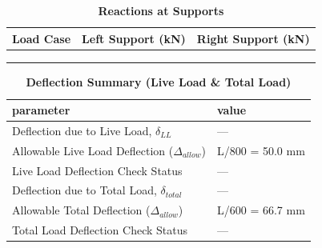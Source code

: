 \documentclass[12pt,a4paper]{report}
\numberwithin{table}{chapter}
\numberwithin{figure}{chapter}
\begin{document}
\vspace{1em}
\begin{longtable}{|>{\centering\arraybackslash}p{5.2cm}|>{\centering\arraybackslash}p{5.2cm}|>{\centering\arraybackslash}p{5.2cm}|}
\caption{\textbf{Reactions at Supports}}
\hline
\textbf{Load Case} & \textbf{Left Support (kN)} & \textbf{Right Support (kN)} \\[6pt]
\hline
 &  &  \\[6pt]
\hline
 &  &  \\[6pt]
\hline
 &  &  \\[6pt]
\hline
\end{longtable}

\vspace{1em}
\begin{longtable}{|L{7cm}|p{8.5cm}|}
\caption{\textbf{Deflection Summary (Live Load \& Total Load)}}
\hline
\textbf{parameter} & \textbf{value} \\
\hline
\textnormal{Deflection due to Live Load, $\delta_{LL}$} & --- \\[6pt]
\hline
\textnormal{Allowable Live Load Deflection ($\Delta_{allow}$)} & L/800 = 50.0 mm \\[6pt]
\hline
\textnormal{Live Load Deflection Check Status} & --- \\[6pt]
\hline
\textnormal{Deflection due to Total Load, $\delta_{total}$} & --- \\[6pt]
\hline
\textnormal{Allowable Total Deflection ($\Delta_{allow}$)} & L/600 = 66.7 mm \\[6pt]
\hline
\textnormal{Total Load Deflection Check Status} & --- \\[6pt]
\hline
\end{longtable}
\end{document}
